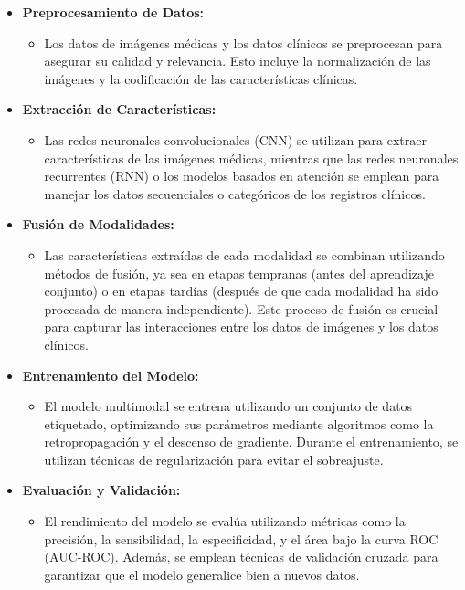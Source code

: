   \begin{itemize}
    \item \textbf{Preprocesamiento de Datos:}
    \begin{itemize}
        \item Los datos de imágenes médicas y los datos clínicos se preprocesan para asegurar su calidad y relevancia. Esto incluye la normalización de las imágenes y la codificación de las características clínicas.
    \end{itemize}
    
    \item \textbf{Extracción de Características:}
    \begin{itemize}
        \item Las redes neuronales convolucionales (CNN) se utilizan para extraer características de las imágenes médicas, mientras que las redes neuronales recurrentes (RNN) o los modelos basados en atención se emplean para manejar los datos secuenciales o categóricos de los registros clínicos.
    \end{itemize}
    
    \item \textbf{Fusión de Modalidades:}
    \begin{itemize}
        \item Las características extraídas de cada modalidad se combinan utilizando métodos de fusión, ya sea en etapas tempranas (antes del aprendizaje conjunto) o en etapas tardías (después de que cada modalidad ha sido procesada de manera independiente). Este proceso de fusión es crucial para capturar las interacciones entre los datos de imágenes y los datos clínicos.
    \end{itemize}
    
    \item \textbf{Entrenamiento del Modelo:}
    \begin{itemize}
        \item El modelo multimodal se entrena utilizando un conjunto de datos etiquetado, optimizando sus parámetros mediante algoritmos como la retropropagación y el descenso de gradiente. Durante el entrenamiento, se utilizan técnicas de regularización para evitar el sobreajuste.
    \end{itemize}
    
    \item \textbf{Evaluación y Validación:}
    \begin{itemize}
        \item El rendimiento del modelo se evalúa utilizando métricas como la precisión, la sensibilidad, la especificidad, y el área bajo la curva ROC (AUC-ROC). Además, se emplean técnicas de validación cruzada para garantizar que el modelo generalice bien a nuevos datos.
    \end{itemize}
\end{itemize}

